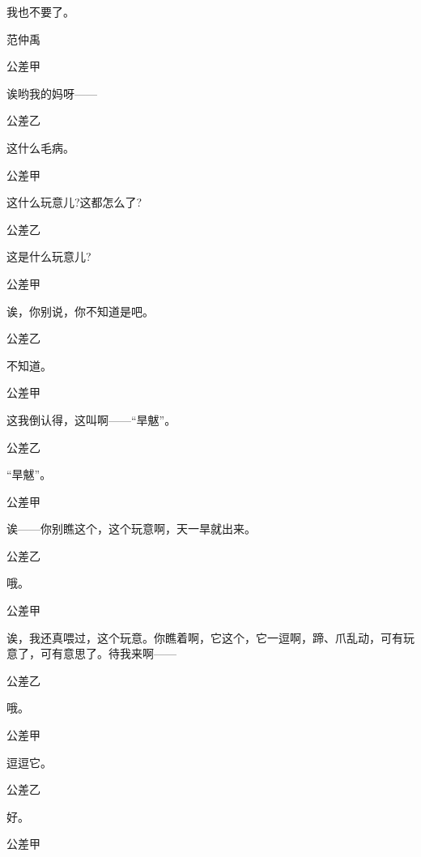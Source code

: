 我也不要了。

范仲禹\hspace{20pt}~


公差甲\hspace{20pt}~

诶哟我的妈呀------

公差乙\hspace{20pt}~

这什么毛病。

公差甲\hspace{20pt}~

这什么玩意儿?这都怎么了?

公差乙\hspace{20pt}~

这是什么玩意儿?

公差甲\hspace{20pt}~

诶，你别说，你不知道是吧。

公差乙\hspace{20pt}~

不知道。

公差甲\hspace{20pt}~

这我倒认得，这叫啊------``旱魃''。

公差乙\hspace{20pt}~

``旱魃''。

公差甲\hspace{20pt}~

诶------你别瞧这个，这个玩意啊，天一旱就出来。

公差乙\hspace{20pt}~

哦。

公差甲

诶，我还真喂过，这个玩意。你瞧着啊，它这个，它一逗啊，蹄、爪乱动，可有玩意了，可有意思了。待我来啊------

公差乙\hspace{20pt}~

哦。

公差甲\hspace{20pt}~

逗逗它。

公差乙\hspace{20pt}~

好。

公差甲\hspace{20pt}~

